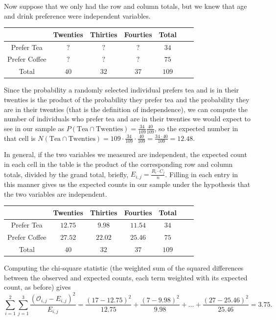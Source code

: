 Now suppose that we only had the row and column totals, but we knew that age and drink preference were independent variables.
\renewcommand{\arraystretch}{1.25}
\begin{center}
\begin{tabular}{|c|c|c|c|c|c|c|}
\hline
 & Twenties & Thirties & Fourties & Total \\
\hline
Prefer Tea & $?$ & $?$ & $?$ & $34$  \\
\hline
Prefer Coffee & $?$ & $?$ & $?$ & $75$ \\
\hline
Total & $40$ & $32$ & $37$  & $109$  \\
\hline
\end{tabular}
\end{center}

Since the probability a randomly selected individual prefers tea and is in their twenties is the product of the probability they prefer tea and the probability they are in their twenties (that is the definition of independence), we can compute the number of individuals who prefer tea and are in their twenties we would expect to see in our sample as $P(\text{Tea} \cap \text{Twenties}) = \frac{34}{109}\frac{40}{109}$, so the expected number in that cell is $N(\text{Tea} \cap \text{Twenties}) = 109\cdot\frac{34}{109}\cdot\frac{40}{109} = \frac{34\cdot 40}{109} = 12.48$.

In general, if the two variables we measured are independent, the expected count in each cell in the table is the product of the corresponding row and column totals, divided by the grand total, briefly, $E_{i,j} = \frac{R_i \cdot C_j}{n}$. Filling in each entry in this manner gives us the expected counts in our sample under the hypothesis that the two variables are independent.
\renewcommand{\arraystretch}{1.25}
\begin{center}
\begin{tabular}{|c|c|c|c|c|c|c|}
\hline
 & Twenties & Thirties & Fourties & Total \\
\hline
Prefer Tea & $12.75$ & $9.98$ & $11.54$ & $34$  \\
\hline
Prefer Coffee & $27.52$ & $22.02$ & $25.46$ & $75$ \\
\hline
Total & $40$ & $32$ & $37$  & $109$  \\
\hline
\end{tabular}
\end{center}

Computing the chi-square statistic (the weighted sum of the squared differences between the observed and expected counts, each term weighted with its expected count, as before) gives
$$\sum_{i=1}^2\sum_{j=1}^3 \frac{(\mathcal{O}_{i,j} - E_{i,j})^2}{E_{i,j}} = \frac{(17-12.75)^2}{12.75} + \frac{(7-9.98)^2}{9.98} + \dots + \frac{(27-25.46)^2}{25.46} = 3.75.$$

